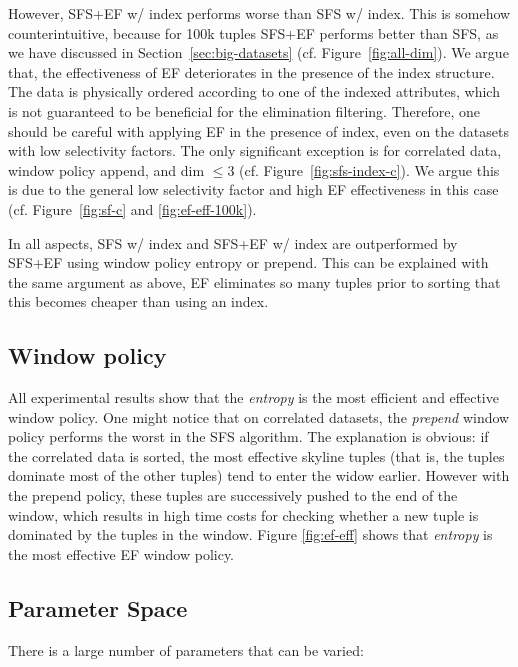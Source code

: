 However, SFS+EF w/ index performs worse than SFS w/ index. 
This is somehow counterintuitive, because for 100k tuples 
SFS+EF performs better than SFS, as we have discussed
in Section~\ref{sec:big-datasets} (cf. Figure~\ref{fig:all-dim}).
We argue that, the effectiveness of EF deteriorates
in the presence of the index structure.
The data is physically ordered according to one of the indexed attributes,
which is not guaranteed to be beneficial for the elimination filtering.
Therefore, one should be careful with applying EF in the presence of index,
even on the datasets with low selectivity factors.
%
The only significant exception is for correlated data, window policy append, and dim 
$\le 3$ (cf. Figure~\ref{fig:sfs-index-c}).
We argue this is due to the general low selectivity factor and high EF effectiveness in 
this case (cf. Figure~\ref{fig:sf-c} and \ref{fig:ef-eff-100k}).

In all aspects, SFS w/ index and SFS+EF w/ index are outperformed
by SFS+EF using window policy entropy or prepend. This can
be explained with the same argument as above, EF eliminates
so many tuples prior to sorting that this becomes cheaper than
using an index.

\subsection{Window policy}
All experimental results show that the \emph{entropy} is
the most efficient and effective window policy.
One might notice that on correlated datasets, the \emph{prepend}
window policy performs the worst in the SFS algorithm. 
The explanation is obvious: if the correlated data is sorted,
the most effective skyline tuples (that is, the tuples dominate 
most of the other tuples) tend to enter the widow earlier. 
However with the prepend policy, these tuples are successively pushed
to the end of the window, which results in high time costs
for checking whether a new tuple is dominated by
the tuples in the window.
Figure \ref{fig:ef-eff} shows that \emph{entropy} is
the most effective EF window policy. 



\subsection{Parameter Space}

There is a large number of parameters that can be varied:

